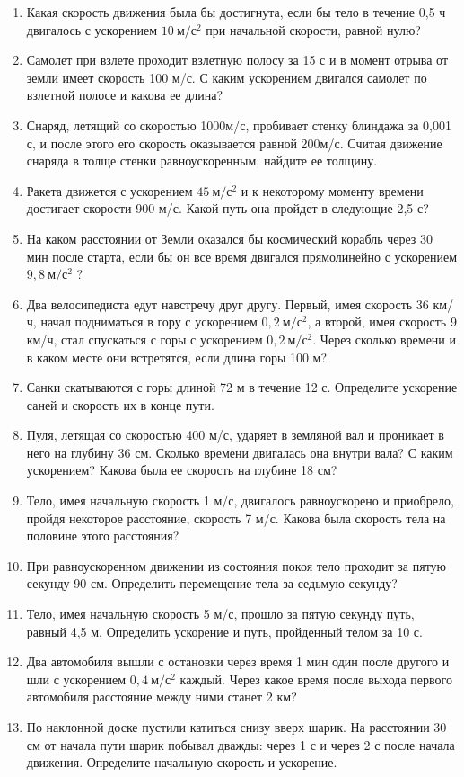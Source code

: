 \documentclass[a5paper, 10pt]{diss_4}
\renewcommand{\'}{\,'}
\begin{document}
\begin{enumerate}
\item Какая   скорость    движения   была   бы достигнута,   если   бы   тело   в   течение   0,5  ч двигалось с ускорением $10\ м/с^2$ при начальной скорости, равной нулю?
\item Самолет  при   взлете   проходит   взлетную  полосу  за 15 с и  в  момент отрыва от земли   имеет   скорость    100   м/с. С каким ускорением   двигался   самолет   по   взлетной полосе и какова ее длина?
\item Снаряд, летящий со скоростью 1000м/с, пробивает   стенку   блиндажа   за 0,001   с,  и  после этого его скорость  оказывается   равной 200м/с.   Считая    движение снаряда   в   толще   стенки   равноускоренным, найдите ее толщину.
\item Ракета движется с ускорением $45\ м/с^2$ и к некоторому моменту времени достигает скорости  900  м/с.  Какой   путь  она  пройдет в следующие 2,5 с?
\item На   каком   расстоянии от Земли оказался бы космический корабль через 30 мин после старта, если бы он все время двигался  прямолинейно с ускорением $9,8\ м/с^2$ ?
\item Два велосипедиста едут навстречу друг другу. Первый, имея скорость 36 км/ч, начал подниматься в гору с ускорением $0,2\ м/с^2$, а второй, имея скорость 9 км/ч, стал спускаться с горы с ускорением $0,2\ м/с^2$. Через сколько времени и в каком месте они встретятся, если длина горы 100 м?
\item Санки скатываются с горы длиной 72 м в течение 12 с. Определите ускорение саней и скорость их в конце пути.
\item Пуля, летящая со скоростью 400 м/с, ударяет в земляной вал и проникает в него на глубину 36 см. Сколько времени двигалась она внутри вала? С каким ускорением? Какова была ее скорость на глубине 18 см?
\item Тело, имея начальную скорость 1 м/с, двигалось равноускорено и приобрело, пройдя некоторое расстояние, скорость 7 м/с. Какова была скорость тела на половине этого расстояния?
\item При равноускоренном движении из состояния покоя тело проходит за пятую секунду 90 см. Определить перемещение тела за седьмую секунду?
\item Тело, имея начальную скорость 5 м/с, прошло за пятую секунду путь, равный 4,5 м. Определить ускорение и путь, пройденный телом за 10 с.
\item Два автомобиля вышли с остановки через время 1 мин один после другого и шли с ускорением $0,4\ м/с^2$ каждый. Через какое время после выхода первого автомобиля расстояние между ними станет 2 км?
\item По наклонной доске пустили катиться снизу вверх шарик. На расстоянии 30 см от начала пути шарик побывал дважды: через 1 с и через 2 с после начала движения. Определите начальную скорость и ускорение.
\end{enumerate}
\end{document}
